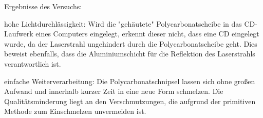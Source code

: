 Ergebnisse des Versuchs:
\begin{enumerate*}
    \item hohe Lichtdurchlässigkeit: Wird die "gehäutete" Polycarbonatscheibe in das CD-Laufwerk eines Computers eingelegt, erkennt dieser nicht, dass eine CD eingelegt wurde, da der Laserstrahl ungehindert durch die Polycarbonatscheibe geht. Dies beweist ebenfalls, dass die Aluminiumschicht für die Reflektion des Laserstrahls verantwortlich ist.
    \item einfache Weiterverarbeitung: Die Polycarbonatschnipsel lassen sich ohne großen Aufwand und innerhalb kurzer Zeit in eine neue Form schmelzen. Die Qualitätsminderung liegt an den Verschmutzungen, die aufgrund der primitiven Methode zum Einschmelzen unvermeiden ist.
\end{enumerate*}
